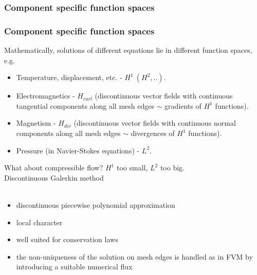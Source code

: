 \documentclass{beamer}
\begin{document}



\begin{frame}
\frametitle{Component specific function spaces}
\end{frame}

\begin{frame}
\frametitle{Component specific function spaces}
Mathematically, solutions of different equations lie in different function spaces, e.g.
\begin{itemize}
\item Temperature, displacement, etc. - $H^1\ \left(H^2, ..\right)$.
\item Electromagnetics - $H_{curl}$ (discontinuous vector fields with continuous tangential components along all mesh edges $\sim$ gradients of $H^1$ functions).
\item Magnetism - $H_{div}$ (discontinuous vector fields with continuous normal components along all mesh edges $\sim$ divergences of $H^1$ functions).
\item Pressure (in Navier-Stokes equations) - $L^2$.
\end{itemize}
\end{frame}

\begin{frame}
\begin{center}
What about compressible flow? $H^1$ too small, $L^2$ too big.\\
\vspace{1cm}
Discontinuous Galerkin method\\\ \\
\begin{itemize}
\item discontinuous piecewise polynomial approximation
\item local character
\item well suited for conservation laws
\item the non-uniqueness of the solution on mesh edges is handled as in FVM by introducing a suitable numerical flux
\end{itemize}
\end{center}
\end{frame}
\end{document}
